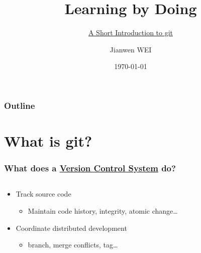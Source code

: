 \documentclass[11pt,ignorenonframetext,]{beamer}
\title[A Short Introduction to git]{Learning by Doing}
\subtitle{\href{https://github.com/weijianwen/GitForBeginners}{{A Short Introduction to git}}}
\author{Jianwen WEI}
\institute[SJTU]{Shanghai Jiaotong University}
\date{\today}
\begin{document}
\frame{\titlepage}

\begin{frame}
       \frametitle{Outline}
       \tableofcontents
\end{frame}

\section{What is git?}

\begin{frame}\frametitle{What does a
\href{http://en.wikipedia.org/wiki/Revision\_control}{Version Control System} 
do?}

\begin{columns}
  \begin{column}{0.7\textwidth}
\begin{itemize}
\item
  Track source code
  \begin{itemize}
  \item
    Maintain code history, integrity, atomic change\ldots{}
  \end{itemize}
\item
  Coordinate distributed development
  \begin{itemize}
  \item
    branch, merge conflicts, tag\ldots{}
  \end{itemize}
\end{itemize}

 \end{column}


\end{columns}
\end{frame}
\end{document}
